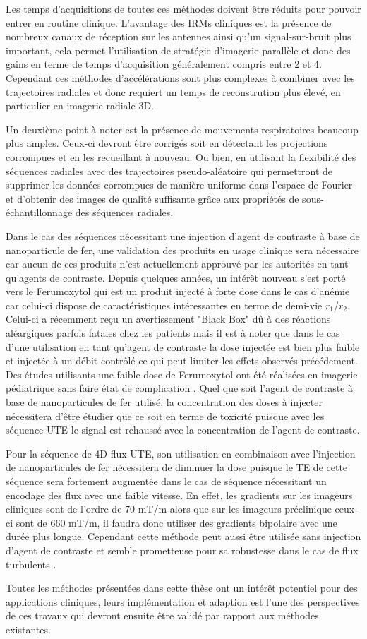 Les temps d'acquisitions de toutes ces méthodes doivent être réduits pour pouvoir entrer en routine clinique. L'avantage des IRMs cliniques est la présence de nombreux canaux de réception sur les antennes ainsi qu'un signal-sur-bruit plus important, cela permet l'utilisation de stratégie d'imagerie parallèle et donc des gains en terme de temps d'acquisition généralement compris entre 2 et 4. Cependant ces méthodes d'accélérations sont plus complexes à combiner avec les trajectoires radiales et donc requiert un temps de reconstrution plus élevé, en particulier en imagerie radiale 3D.

Un deuxième point à noter est la présence de mouvements respiratoires beaucoup plus amples. Ceux-ci devront être corrigés soit en détectant les projections corrompues et en les recueillant à nouveau. Ou bien, en utilisant la flexibilité des séquences radiales avec des trajectoires pseudo-aléatoire qui permettront de supprimer les données corrompues de manière uniforme dans l'espace de Fourier et d'obtenir des images de qualité suffisante grâce aux propriétés de sous-échantillonnage des séquences radiales.

Dans le cas des séquences nécessitant une injection d'agent de contraste à base de nanoparticule de fer, une validation des produits en usage clinique sera nécessaire car aucun de ces produits n'est actuellement approuvé par les autorités en tant qu'agents de contraste. Depuis quelques années, un intérêt nouveau s'est porté vers le Ferumoxytol qui est un produit injecté à forte dose dans le cas d'anémie car celui-ci dispose de caractéristiques intéressantes en terme de demi-vie $r_1$/$r_2$. Celui-ci a récemment reçu un avertissement "Black Box" dû à des réactions aléargiques parfois fatales chez les patients mais il est à noter que dans le cas d'une utilisation en tant qu'agent de contraste la dose injectée est bien plus faible et injectée à un débit contrôlé ce qui peut limiter les effets observés précédement. Des études utilisants une faible dose de Ferumoxytol ont été réalisées en imagerie pédiatrique sans faire état de complication \cite{han2014four,Nayak:2014aa}.  Quel que soit l'agent de contraste à base de nanoparticules de fer utilisé, la concentration des doses à injecter nécessitera d'être étudier que ce soit en terme de toxicité puisque avec les séquence UTE le signal est rehaussé avec la concentration de l'agent de contraste.

Pour la séquence de 4D flux UTE, son utilisation en combinaison avec l'injection de nanoparticules de fer nécessitera de diminuer la dose puisque le TE de cette séquence sera fortement augmentée dans le cas de séquence nécessitant un encodage des flux avec une faible vitesse. En effet, les gradients sur les imageurs cliniques sont de l'ordre de 70 mT/m alors que sur les imageurs préclinique ceux-ci sont de 660 mT/m, il faudra donc utiliser des gradients bipolaire avec une durée plus longue. Cependant cette méthode peut aussi être utilisée sans injection d'agent de contraste et semble prometteuse pour sa robustesse dans le cas de flux turbulents \cite{Kadbi:2014uq}.

Toutes les méthodes présentées dans cette thèse ont un intérêt potentiel pour des applications cliniques, leurs implémentation et adaption est l'une des perspectives de ces travaux qui devront ensuite être validé par rapport aux méthodes existantes.
